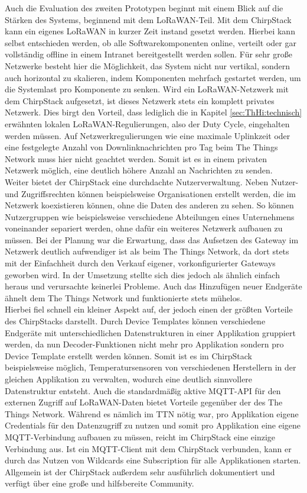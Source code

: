 Auch die Evaluation des zweiten Prototypen beginnt mit einem Blick auf die Stärken des Systems, beginnend mit dem LoRaWAN-Teil. Mit dem ChirpStack kann ein eigenes LoRaWAN in kurzer Zeit instand gesetzt werden. Hierbei kann selbst entschieden werden, ob alle Softwarekomponenten online, verteilt oder gar vollständig offline in einem Intranet bereitgestellt werden sollen. Für sehr große Netzwerke besteht hier die Möglichkeit, das System nicht nur vertikal, sondern auch horizontal zu skalieren, indem Komponenten mehrfach gestartet werden, um die Systemlast pro Komponente zu senken. Wird ein LoRaWAN-Netzwerk mit dem ChirpStack aufgesetzt, ist dieses Netzwerk stets ein komplett privates Netzwerk. Dies birgt den Vorteil, dass lediglich die in Kapitel \ref{sec:ThHi:technisch} erwähnten lokalen LoRaWAN-Regulierungen, also der Duty Cycle, eingehalten werden müssen. Auf Netzwerkregulierungen wie eine maximale Uplinkzeit oder eine festgelegte Anzahl von Downlinknachrichten pro Tag beim The Things Network muss hier nicht geachtet werden. Somit ist es in einem privaten Netzwerk möglich, eine deutlich höhere Anzahl an Nachrichten zu senden.\\
Weiter bietet der ChirpStack eine durchdachte Nutzerverwaltung. Neben Nutzer- und Zugriffsrechten können beispielsweise Organisationen erstellt werden, die im Netzwerk koexistieren können, ohne die Daten des anderen zu sehen. So können Nutzergruppen wie beispielsweise verschiedene Abteilungen eines Unternehmens voneinander separiert werden, ohne dafür ein weiteres Netzwerk aufbauen zu müssen. Bei der Planung war die Erwartung, dass das Aufsetzen des Gateway im Netzwerk deutlich aufwendiger ist als beim The Things Network, da dort stets mit der Einfachheit durch den Verkauf eigener, vorkonfigurierter Gateways geworben wird. In der Umsetzung stellte sich dies jedoch als ähnlich einfach heraus und verursachte keinerlei Probleme. Auch das Hinzufügen neuer Endgeräte ähnelt dem The Things Network und funktionierte stets mühelos.\\
Hierbei fiel schnell ein kleiner Aspekt auf, der jedoch einen der größten Vorteile des ChirpStacks darstellt. Durch Device Templates können verschiedene Endgeräte mit unterschiedlichen Datenstrukturen in einer Applikation gruppiert werden, da nun Decoder-Funktionen nicht mehr pro Applikation sondern pro Device Template erstellt werden können. Somit ist es im ChirpStack beispielsweise möglich, Temperatursensoren von verschiedenen Herstellern in der gleichen Applikation zu verwalten, wodurch eine deutlich sinnvollere Datenstruktur entsteht. Auch die standardmäßig aktive MQTT-API für den externen Zugriff auf LoRaWAN-Daten bietet Vorteile gegenüber der des The Things Network. Während es nämlich im TTN nötig war, pro Applikation eigene Credentials für den Datenzugriff zu nutzen und somit pro Applikation eine eigene MQTT-Verbindung aufbauen zu müssen, reicht im ChirpStack eine einzige Verbindung aus. Ist ein MQTT-Client mit dem ChirpStack verbunden, kann er durch das Nutzen von Wildcards eine Subscription für alle Applikationen starten. Allgemein ist der ChirpStack außerdem sehr ausführlich dokumentiert und verfügt über eine große und hilfsbereite Community.\\
